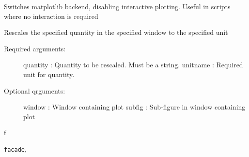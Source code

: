 \documentclass[letterpaper,10pt,english]{sphinxmanual}
\begin{document}

\begin{fulllineitems}
\label{index:facade.switch_nongui}
Switches matplotlib backend, disabling interactive plotting.
Useful in scripts where no interaction is required

\end{fulllineitems}


\begin{fulllineitems}
\label{index:facade.rescale}
Rescales the specified quantity in the specified window to the specified unit
\begin{description}
\item[{Required arguments:}] \leavevmode
quantity   : Quantity to be rescaled.  Must be a string.
unitname   : Required unit for quantity.

\item[{Optional qrguments:}] \leavevmode
window     : Window containing plot
subfig     : Sub-figure in window containing plot

\end{description}

\end{fulllineitems}



\renewcommand{\indexname}{Python Module Index}
\begin{theindex}
\def\bigletter#1{{\Large\sffamily#1}\nopagebreak\vspace{1mm}}
\bigletter{f}
\item {\texttt{facade}}, \pageref{index:module-facade}
\end{theindex}

\renewcommand{\indexname}{Index}
\printindex
\end{document}
